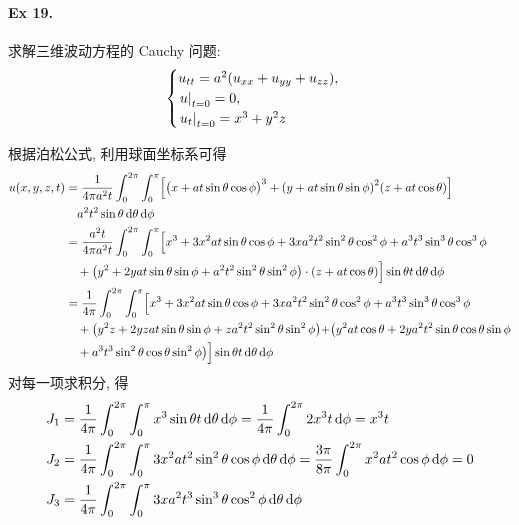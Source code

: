 \paragraph{Ex 19.}
求解三维波动方程的 Cauchy 问题:
\[ \begin{cases}
u_{tt} = a^2 (u_{xx} + u_{yy} + u_{zz}), \\
{\left.{u} \right|}_{t=0} = 0, \\
{\left.{u_t} \right|}_{t=0} = x^3 + y^2 z
\end{cases} \]

\begin{solution}
根据泊松公式, 利用球面坐标系可得
\begin{align*}
u(x, y, z, t)
&= \frac{1}{4\pi a^2 t} \int_0^{2\pi} \int_0^\pi \Bigl[
    \bigl( x + at\sin\theta \cos\phi \bigr)^3
    + {\left( {y + at\sin\theta \sin\phi} \right)}^2 (z + at\cos\theta)
    \Bigr] \\
    &\quad a^2 t^2 \sin\theta \operatorname{d\!}\theta \operatorname{d\!}\phi \\
&= \frac{a^2 t}{4\pi a^2 t} \int_0^{2\pi} \int_0^\pi \Bigl[
    x^3 + 3x^2 at\sin\theta \cos\phi
    + 3x a^2t^2\sin^2\theta \cos^2\phi + a^3t^3\sin^3\theta \cos^3\phi \\
    &\quad+\bigl( y^2 + 2yat\sin\theta \sin\phi + a^2t^2\sin^2\theta
	    \sin^2\phi \bigr) \cdot (z + at\cos\theta) \Bigr]
	    \sin\theta t \operatorname{d\!}\theta \operatorname{d\!}\phi \\
&=\frac{1}{4\pi} \int_0^{2\pi} \int_0^\pi \Bigl[
    x^3 + 3x^2 at\sin\theta \cos\phi
    + 3x a^2t^2\sin^2\theta \cos^2\phi
    +a^3t^3\sin^3\theta \cos^3\phi \\
    &\quad+{\left( {
        y^2z + 2yzat\sin\theta \sin\phi + za^2t^2\sin^2\theta \sin^2\phi
    } \right)}
    +\bigr(
        y^2at\cos\theta + 2ya^2t^2\sin\theta \cos\theta \sin\phi \\
    &\quad+ a^3t^3\sin^2\theta \cos\theta \sin^2\phi \bigr)
    \Bigr] \sin\theta t \operatorname{d\!}\theta \operatorname{d\!}\phi
\end{align*}
对每一项求积分, 得
\begin{align*}
J_1 &= \frac{1}{4\pi} \int_0^{2\pi} \int_0^\pi
        x^3 \sin\theta t \diff\theta \diff\phi
    = \frac{1}{4\pi} \int_0^{2\pi} 2x^3t \diff\phi = x^3t \\
J_2 &= \frac{1}{4\pi} \int_0^{2\pi} \int_0^\pi
        3x^2 at^2\sin^2\theta \cos\phi \diff\theta \diff\phi
    = \frac{3\pi}{8\pi} \int_0^{2\pi} x^2at^2 \cos\phi \diff\phi = 0 \\
J_3 &= \frac{1}{4\pi} \int_0^{2\pi} \int_0^\pi
        3x a^2t^3\sin^3\theta \cos^2\phi \diff\theta \diff\phi

\end{align*}
\end{solution}
